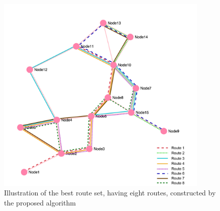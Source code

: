\begin{figure}[H]
    \begin{center}
    \includegraphics[width=4in]{assets/mandlnetwork_8routes.png}
    \end{center}
    \caption{Illustration of the best route set, having eight routes, constructed by the proposed algorithm}
    \label{fig:bestRouteSet8} 
\end{figure}

